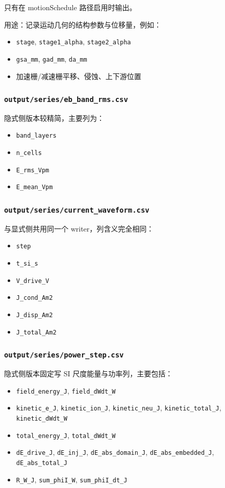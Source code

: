 \documentclass[11pt,a4paper]{ctexart}
\newcommand{\code}[1]{\texttt{#1}}
\newcommand{\file}[1]{\texttt{#1}}
\begin{document}
只有在 motionSchedule 路径启用时输出。

用途：记录运动几何的结构参数与位移量，例如：

\begin{itemize}
  \item \code{stage}, \code{stage1\_alpha}, \code{stage2\_alpha}
  \item \code{gsa\_mm}, \code{gad\_mm}, \code{da\_mm}
  \item 加速栅/减速栅平移、侵蚀、上下游位置
\end{itemize}

\subsubsection{\file{output/series/eb\_band\_rms.csv}}

隐式侧版本较精简，主要列为：

\begin{itemize}
  \item \code{band\_layers}
  \item \code{n\_cells}
  \item \code{E\_rms\_Vpm}
  \item \code{E\_mean\_Vpm}
\end{itemize}

\subsubsection{\file{output/series/current\_waveform.csv}}

与显式侧共用同一个 writer，列含义完全相同：

\begin{itemize}
  \item \code{step}
  \item \code{t\_si\_s}
  \item \code{V\_drive\_V}
  \item \code{J\_cond\_Am2}
  \item \code{J\_disp\_Am2}
  \item \code{J\_total\_Am2}
\end{itemize}

\subsubsection{\file{output/series/power\_step.csv}}

隐式侧版本固定写 SI 尺度能量与功率列，主要包括：

\begin{itemize}
  \item \code{field\_energy\_J}, \code{field\_dWdt\_W}
  \item \code{kinetic\_e\_J}, \code{kinetic\_ion\_J}, \code{kinetic\_neu\_J}, \code{kinetic\_total\_J}, \code{kinetic\_dWdt\_W}
  \item \code{total\_energy\_J}, \code{total\_dWdt\_W}
  \item \code{dE\_drive\_J}, \code{dE\_inj\_J}, \code{dE\_abs\_domain\_J}, \code{dE\_abs\_embedded\_J}, \code{dE\_abs\_total\_J}
  \item \code{R\_W\_J}, \code{sum\_phiI\_W}, \code{sum\_phiI\_dt\_J}
\end{itemize}
\end{document}
